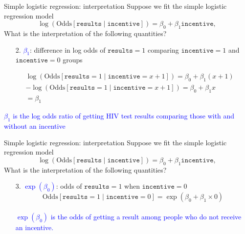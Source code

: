 \documentclass[10pt,t]{beamer}
\begin{document}
\begin{frame}{Simple logistic regression: interpretation}
	Suppose we fit the simple logistic regression model $$\log\left(\text{Odds}[\texttt{results} \mid \texttt{incentive}]\right) = \beta_0 + \beta_1 \texttt{incentive},$$ What is the interpretation of the following quantities?
	
	\medskip
	
	\begin{enumerate}
		\item[2.] \textcolor{blue}{$\beta_1$}: difference in log odds of $\texttt{results} = 1$ comparing $\texttt{incentive} = 1$ and $\texttt{incentive} =0$ groups
	\end{enumerate} 

	\begin{align*}
	&\log\left(\text{Odds}[\texttt{results} =1 \mid \texttt{incentive} = x+1]\right) = \beta_0 + \beta_1(x+1)\\
	&-\log\left(\text{Odds}[\texttt{results} =1 \mid \texttt{incentive} = x + 1]\right) = \beta_0 + \beta_1x \\
	&= \beta_1
\end{align*}

\medskip

\textcolor{blue}{$\beta_1$ is the log odds ratio of getting HIV test results comparing those with and without an incentive}

\end{frame}

\begin{frame}{Simple logistic regression: interpretation}
	Suppose we fit the simple logistic regression model $$\log\left(\text{Odds}[\texttt{results} \mid \texttt{incentive}]\right) = \beta_0 + \beta_1 \texttt{incentive},$$ What is the interpretation of the following quantities?
	\medskip
	\begin{enumerate}
		\item[3.] \textcolor{blue}{$\exp(\beta_0)$}: odds of $\texttt{results} = 1$ when $\texttt{incentive} = 0$
		$$\text{Odds}[\texttt{results}  =1 \mid \texttt{incentive} = 0] = \exp(\beta_0 + \beta_1\times 0)$$\\
		
		\textcolor{blue}{$\exp(\beta_0)$ is the odds of getting a result among people who do not receive an incentive.}
	\end{enumerate} 
\end{frame}
\end{document}
